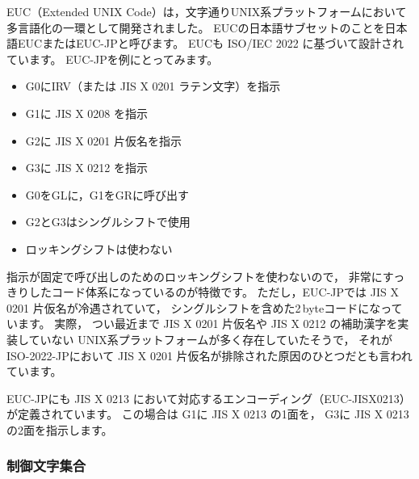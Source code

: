 \documentclass[a4j,10pt,fleqn]{jsarticle}
\begin{document}
EUC（Extended UNIX Code）は，文字通りUNIX系プラットフォームにおいて多言語化の一環として開発されました。
EUCの日本語サブセットのことを日本語EUCまたはEUC-JPと呼びます。
EUCも ISO/IEC 2022 に基づいて設計されています。
EUC-JPを例にとってみます。
\begin{itemize}
\item G0にIRV（または JIS X 0201 ラテン文字）を指示
\item G1に JIS X 0208 を指示
\item G2に JIS X 0201 片仮名を指示
\item G3に JIS X 0212 を指示
\item G0をGLに，G1をGRに呼び出す
\item G2とG3はシングルシフトで使用
\item ロッキングシフトは使わない
\end{itemize}

指示が固定で呼び出しのためのロッキングシフトを使わないので，
非常にすっきりしたコード体系になっているのが特徴です。
ただし，EUC-JPでは JIS X 0201 片仮名が冷遇されていて，
シングルシフトを含めた2\,byteコードになっています。
実際，
つい最近まで JIS X 0201 片仮名や JIS X 0212 の補助漢字を実装していない
UNIX系プラットフォームが多く存在していたそうで，
それがISO-2022-JPにおいて JIS X 0201 片仮名が排除された原因のひとつだとも言われています。

EUC-JPにも JIS X 0213 において対応するエンコーディング（EUC-JISX0213）が定義されています。
この場合は
G1に JIS X 0213 の1面を，
G3に JIS X 0213 の2面を指示します。

\subsubsection{制御文字集合} \label{sec:ctrl-charset}
\end{document}
